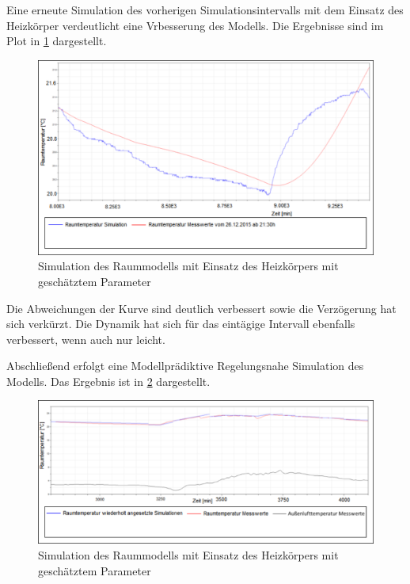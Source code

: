 Eine erneute Simulation des vorherigen Simulationsintervalls mit dem Einsatz des Heizkörper verdeutlicht eine Vrbesserung des Modells. Die Ergebnisse sind im Plot in \ref{fig:valid2pe} dargestellt.

\begin{figure}
\centering
\includegraphics[width=\textwidth]{abbildungen/20160330_validierung2pe}
\caption{Simulation des Raummodells mit Einsatz des Heizkörpers mit geschätztem Parameter}
\label{fig:valid2pe}
\end{figure}

Die Abweichungen der Kurve sind deutlich verbessert sowie die Verzögerung hat sich verkürzt. Die Dynamik hat sich für das eintägige Intervall ebenfalls verbessert, wenn auch nur leicht.

Abschließend erfolgt eine Modellprädiktive Regelungsnahe Simulation des Modells. Das Ergebnis ist in \ref{fig:bench} dargestellt.

\begin{figure}
\centering
\includegraphics[width=\textwidth]{abbildungen/20160330_benchmark}
\caption{Simulation des Raummodells mit Einsatz des Heizkörpers mit geschätztem Parameter}
\label{fig:bench}
\end{figure}

